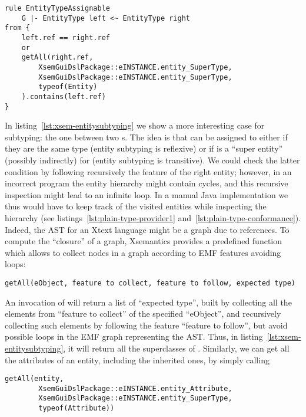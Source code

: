 \begin{lstlisting}[language=xsemantics,float,label=lst:xsem-entitysubtyping,caption=Rule
for \mytt{isAssignable} for entity types.] 
rule EntityTypeAssignable
	G |- EntityType left <~ EntityType right
from {
	left.ref == right.ref
	or
	getAll(right.ref, 
		XsemGuiDslPackage::eINSTANCE.entity_SuperType,
		XsemGuiDslPackage::eINSTANCE.entity_SuperType,
		typeof(Entity)
	).contains(left.ref)
}
\end{lstlisting}

In listing~\ref{lst:xsem-entitysubtyping} we show a more interesting case for
subtyping: the one between two s.  The idea is that
 can be assigned to  either if they are the same type (entity
subtyping is reflexive) or if  is a ``super entity'' (possibly
indirectly) for  (entity subtyping is transitive).  We could check
the latter condition by following recursively the feature  of
the right entity; however, in an incorrect program the entity hierarchy might 
contain cycles, and this recursive inspection might lead to an infinite loop. 
In a manual Java implementation we thus would have to keep track of the visited
entities while inspecting the hierarchy (see
listings~\ref{lst:plain-type-provider1} and~\ref{lst:plain-type-conformance}). 
Indeed, the AST for an Xtext language might be a graph due to references. 
To compute the ``closure'' of a graph, Xsemantics provides a predefined function
which allows to collect nodes in a graph according to EMF features avoiding
loops:

\begin{small}
\begin{verbatim}
getAll(eObject, feature to collect, feature to follow, expected type)
\end{verbatim}
\end{small}

\noindent An invocation of  will return a list of ``expected
type'', built by collecting all the elements from ``feature to collect'' of the
specified ``eObject'', and recursively collecting such elements by following the
feature ``feature to follow'', but avoid possible loops in the EMF graph
representing the AST.
Thus, in listing~\ref{lst:xsem-entitysubtyping}, it will return all
the superclasses of .  Similarly, we can get all the attributes of
an entity, including the inherited ones, by simply calling

\begin{lstlisting}[language=xsemantics] 
	getAll(entity, 
		XsemGuiDslPackage::eINSTANCE.entity_Attribute,
		XsemGuiDslPackage::eINSTANCE.entity_SuperType,
		typeof(Attribute))
\end{lstlisting}


